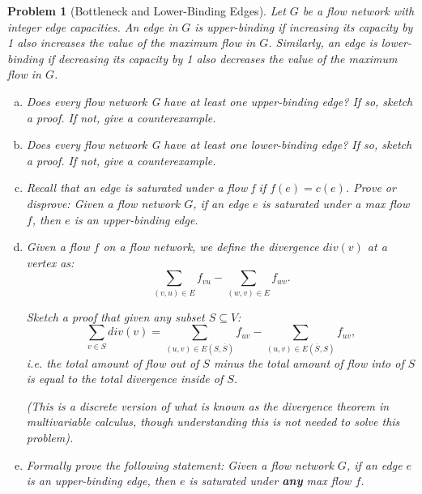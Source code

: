 \documentclass[10pt]{article}
\newtheorem{problem}{\sc\color{cit}Problem}
\begin{document}
\begin{problem}[Bottleneck and Lower-Binding Edges]
Let $G$ be a flow network with integer edge capacities. An edge in $G$ is upper-binding if increasing its capacity by 1 also increases the value of the maximum flow in $G$. Similarly, an edge is lower-binding if decreasing its capacity by 1 also decreases the value of the maximum flow in $G$.
\begin{enumerate}[(a)]
    \item Does every flow network G have at least one upper-binding edge? If so, sketch a proof. If not, give a counterexample.
    \item Does every flow network G have at least one lower-binding edge? If so, sketch a proof. If not, give a counterexample.
    \item Recall that an edge is saturated under a flow f if $f(e) = c(e)$. Prove or disprove: Given a flow network $G$, if an edge $e$ is saturated under a max flow $f$, then $e$ is an upper-binding edge.
    \item Given a flow $f$ on a flow network, we define the divergence $div(v)$ at a vertex as:
    \[
        \sum_{(v,u)\in E} f_{vu} - \sum_{(w,v) \in E} f_{wv}.
    \]
    
    Sketch a proof that given any subset $S \subseteq V$:
    \[
        \sum_{v \in S} div(v) = \sum_{(u,v) \in E(S,\overline{S})} f_{uv} - \sum_{(u,v) \in E(\overline{S},S)} f_{uv},
    \]
    i.e. the total amount of flow out of $S$ minus the total amount of flow into of $S$ is equal to the total divergence inside of $S$.
    
    
    (This is a discrete version of what is known as the divergence theorem in multivariable calculus, though understanding this is not needed to solve this problem).
    \item Formally prove the following statement: Given a flow network $G$, if an edge $e$ is an upper-binding edge, then $e$ is saturated under \textbf{any} max flow $f$.
\end{enumerate}
\end{problem}
\end{document}
